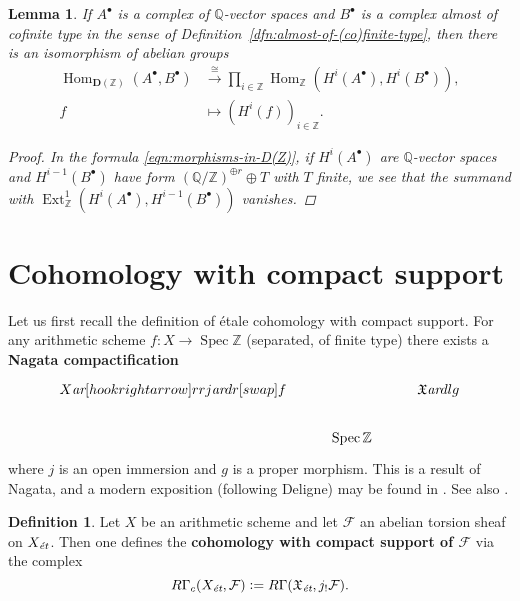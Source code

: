 \documentclass[leqno,12pt]{article}
\theoremstyle{plain}
\newtheorem{lemma}[theorem]{\indent\sc Lemma}
\theoremstyle{definition}
\newtheorem{definition}[theorem]{\indent\sc Definition}
\DeclareMathOperator{\Spec}{Spec}
\DeclareMathOperator{\Hom}{Hom}
\DeclareMathOperator{\Ext}{Ext}
\newcommand{\ZZ}{\mathbb{Z}}
\newcommand{\QQ}{\mathbb{Q}}
\newcommand{\dfn}{\mathrel{\mathop:}=}
\newcommand{\et}{\text{\it \'{e}t}}
\newcommand{\ar}{\text{\it ar}}
\begin{document}
\begin{lemma}
  \label{lemma:morphisms-in-DAb-between-cplx-of-Q-vs-and-almost-cofinite-type-cplx}
  If $A^\bullet$ is a complex of $\QQ$-vector spaces and $B^\bullet$ is a
  complex almost of cofinite type in the sense of
  Definition~\ref{dfn:almost-of-(co)finite-type}, then there is an isomorphism
  of abelian groups
  \begin{align*}
    \Hom_{\mathbf{D} (\ZZ)} (A^\bullet, B^\bullet) & \xrightarrow{\cong}
    \prod_{i\in \ZZ} \Hom_\ZZ (H^i (A^\bullet), H^i (B^\bullet)),\\
    f & \mapsto (H^i (f))_{i\in \ZZ}.
  \end{align*}

  \begin{proof}
    In the formula \eqref{eqn:morphisms-in-D(Z)}, if $H^i (A^\bullet)$ are
    $\QQ$-vector spaces and $H^{i-1} (B^\bullet)$ have form
    $(\QQ/\ZZ)^{\oplus r} \oplus T$ with $T$ finite, we see that the summand with
    $\Ext_\ZZ^1 (H^i (A^\bullet), H^{i-1} (B^\bullet))$ vanishes.
  \end{proof}
\end{lemma}


\section{Cohomology with compact support}
\label{app:modified-cohomology-with-compact-support}

Let us first recall the definition of \'{e}tale cohomology with compact support.
For any arithmetic scheme $f\colon X\to \Spec \ZZ$ (separated, of finite type)
there exists a \textbf{Nagata compactification}
\[ \begin{tikzcd}
X \ar[hookrightarrow]{rr}{j}\ar{dr}[swap]{f} & & \mathfrak{X} \ar{dl}{g} \\
 & \Spec \ZZ
\end{tikzcd} \]
where $j$ is an open immersion and $g$ is a proper morphism. This is a result of
Nagata, and a modern exposition (following Deligne) may be found in
\cite{Conrad-Deligne-Nagata,Conrad-Deligne-Nagata-erratum}. See also
\cite[Expos\'{e}~XVII]{SGA4}.

\begin{definition}
  Let $X$ be an arithmetic scheme and let $\mathcal{F}$ an abelian torsion
  sheaf on $X_\et$. Then one defines the
  \textbf{cohomology with compact support of $\mathcal{F}$} via the complex
  \begin{equation}
    \label{eqn:RGammac-via-extension-by-zero}
    R\Gamma_c (X_\et, \mathcal{F}) \dfn
    R\Gamma (\mathfrak{X}_\text{\it \'et}, j_! \mathcal{F}).
  \end{equation}
\end{definition}
\end{document}
